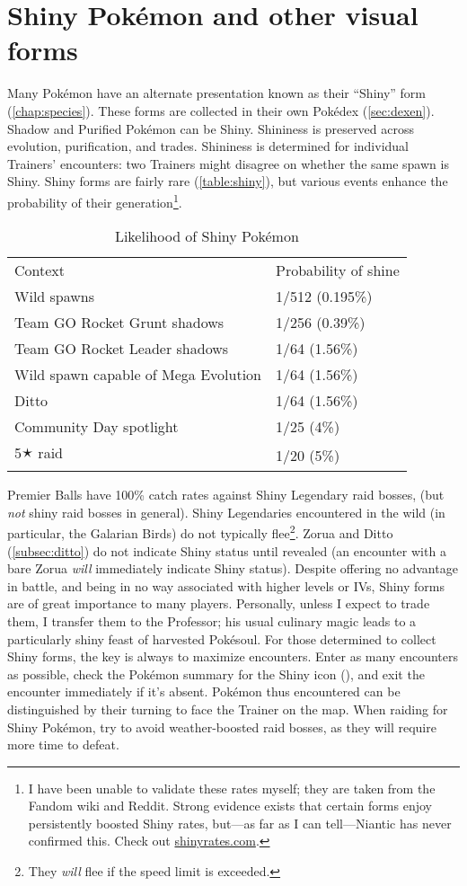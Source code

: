 \section{Shiny Pokémon and other visual forms\label{sec:shiny}}
Many Pokémon have an alternate presentation known as their ``Shiny'' form (\autoref{chap:species}).
These forms are collected in their own Pokédex (\autoref{sec:dexen}).
Shadow and Purified Pokémon can be Shiny.
Shininess is preserved across evolution, purification, and trades.
Shininess is determined for individual Trainers' encounters: two Trainers might disagree on whether the same spawn is Shiny.
Shiny forms are fairly rare (\autoref{table:shiny}), but various events
  enhance the probability of their generation\footnote{I have been unable to validate these rates myself; they are taken from the Fandom wiki and Reddit.
  Strong evidence exists that certain forms enjoy persistently boosted Shiny rates, but---as far as I can tell---Niantic
  has never confirmed this. Check out \href{https://shinyrates.com}{shinyrates.com}.}.
\begin{table}
\centering
\begin{tabular}{ll}
Context & Probability of shine \\
\Midrule
  Wild spawns & 1/512 (0.195\%) \\
  Team GO Rocket Grunt shadows & 1/256 (0.39\%) \\
  Team GO Rocket Leader shadows & 1/64 (1.56\%) \\
  Wild spawn capable of Mega Evolution & 1/64 (1.56\%)\\
  Ditto & 1/64 (1.56\%)\\
  Community Day spotlight & 1/25 (4\%)\\
  5🟉 raid & 1/20 (5\%) \\
\end{tabular}
  \caption{Likelihood of Shiny Pokémon\label{table:shiny}}
\end{table}
Premier Balls have 100\% catch rates against Shiny Legendary raid bosses, (but \textit{not} shiny raid bosses in general).
Shiny Legendaries encountered in the wild (in particular, the Galarian Birds) do not typically flee\footnote{They \textit{will} flee if the speed limit is exceeded.}.
Zorua and Ditto (\autoref{subsec:ditto}) do not indicate Shiny status until revealed (an encounter
  with a bare Zorua \textit{will} immediately indicate Shiny status).
Despite offering no advantage in battle, and being in no way associated with
  higher levels or IVs, Shiny forms are of great importance to many players.
Personally, unless I expect to trade them, I transfer them to the Professor;
 his usual culinary magic leads to a particularly shiny feast of harvested Pokésoul.
For those determined to collect Shiny forms, the key is always to maximize encounters.
Enter as many encounters as possible, check the Pokémon summary
  for the Shiny icon (),
  and exit the encounter immediately if it's absent.
Pokémon thus encountered can be distinguished by their turning to face the Trainer on the map.
When raiding for Shiny Pokémon, try to avoid weather-boosted raid bosses, as they will require more time to defeat.

